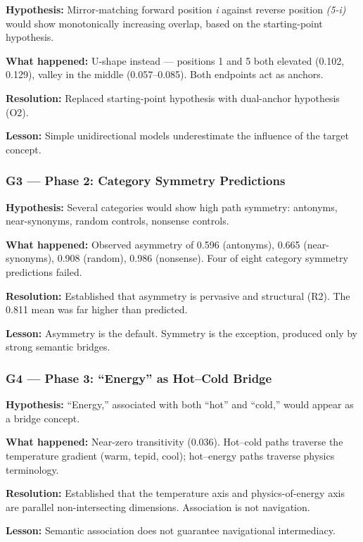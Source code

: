 \textbf{Hypothesis:} Mirror-matching forward position \emph{i} against reverse position \emph{(5-i)} would show monotonically increasing overlap, based on the starting-point hypothesis.

\textbf{What happened:} U-shape instead --- positions 1 and 5 both elevated (0.102, 0.129), valley in the middle (0.057--0.085). Both endpoints act as anchors.

\textbf{Resolution:} Replaced starting-point hypothesis with dual-anchor hypothesis (O2).

\textbf{Lesson:} Simple unidirectional models underestimate the influence of the target concept.

\subsubsection{G3 --- Phase 2: Category Symmetry Predictions}\label{g3-phase-2-category-symmetry-predictions}

\textbf{Hypothesis:} Several categories would show high path symmetry: antonyms, near-synonyms, random controls, nonsense controls.

\textbf{What happened:} Observed asymmetry of 0.596 (antonyms), 0.665 (near-synonyms), 0.908 (random), 0.986 (nonsense). Four of eight category symmetry predictions failed.

\textbf{Resolution:} Established that asymmetry is pervasive and structural (R2). The 0.811 mean was far higher than predicted.

\textbf{Lesson:} Asymmetry is the default. Symmetry is the exception, produced only by strong semantic bridges.

\subsubsection{G4 --- Phase 3: ``Energy'' as Hot--Cold Bridge}\label{g4-phase-3-energy-as-hotcold-bridge}

\textbf{Hypothesis:} ``Energy,'' associated with both ``hot'' and ``cold,'' would appear as a bridge concept.

\textbf{What happened:} Near-zero transitivity (0.036). Hot--cold paths traverse the temperature gradient (warm, tepid, cool); hot--energy paths traverse physics terminology.

\textbf{Resolution:} Established that the temperature axis and physics-of-energy axis are parallel non-intersecting dimensions. Association is not navigation.

\textbf{Lesson:} Semantic association does not guarantee navigational intermediacy.

